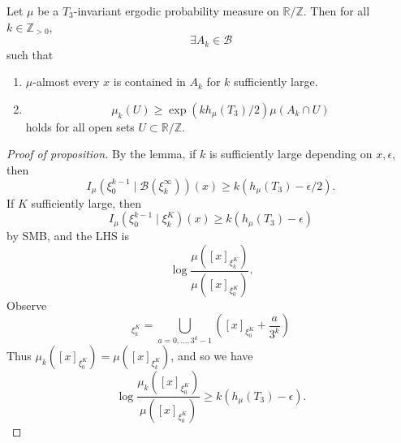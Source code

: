 \documentclass{article}
\newcommand{\B}{\mathcal{B}}
\begin{document}
\begin{cor}
  Let $\mu$ be a $T_3$-invariant ergodic probability measure on $\mathbb{R}/\mathbb{Z}$. Then for all $k \in \mathbb{Z}_{>0}$,
  \begin{equation*}
    \exists A_k \in \B
  \end{equation*}
  such that
  \begin{enumerate}[label=(\arabic*)]
    \item $\mu$-almost every $x$ is contained in $A_k$ for $k$ sufficiently large.
    \item
      \begin{equation*}
        \mu_k(U) \geq \exp(k h_\mu(T_3)/2) \mu(A_k \cap U)
      \end{equation*}
      holds for all open sets $U \subset \mathbb{R}/\mathbb{Z}$.
  \end{enumerate}
\end{cor}
\begin{proof}[Proof of proposition]
  By the lemma, if $k$ is sufficiently large depending on $x,\epsilon$, then
  \begin{equation*}
    I_\mu(\xi_0^{k-1} \mid \B(\xi_k^\infty))(x) \geq k(h_\mu(T_3) - \epsilon/2).
  \end{equation*}
  If $K$ sufficiently large, then
  \begin{equation*}
    I_\mu(\xi_0^{k-1} \mid \xi_k^K)(x) \geq k(h_\mu(T_3) - \epsilon)
  \end{equation*}
  by SMB, and the LHS is
  \begin{equation*}
    \log\frac{\mu([x]_{\xi_k^K})}{\mu([x]_{\xi_0^K})}.
  \end{equation*}
  Observe
  \begin{equation*}
    [x]_{\xi_k^K} = \bigcup_{a=0,\dotsc,3^k-1} ([x]_{\xi_0^K} + \frac{a}{3^k})
  \end{equation*}
  Thus $\mu_k([x]_{\xi_0^K}) = \mu([x]_{\xi_k^K})$, and so we have
  \begin{equation*}
    \log \frac{\mu_k([x]_{\xi_0^K})}{\mu([x]_{\xi_0^K})} \geq k(h_\mu(T_3) - \epsilon).
  \end{equation*}
\end{proof}
\end{document}
